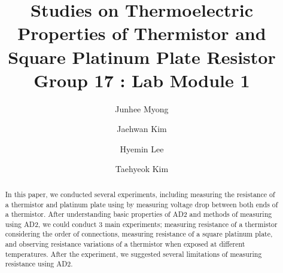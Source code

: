 \documentclass[5p,sort&compress]{elsarticle}
\begin{document}
\begin{frontmatter}
    \title{{\LARGE Studies on Thermoelectric Properties of Thermistor and Square Platinum Plate Resistor}
    \\  {\normalsize Group 17 : Lab Module 1}
    }

    \author[1]{Junhee Myong}
    \author[2]{Jaehwan Kim}
    \author[3]{Hyemin Lee}
    \author[4]{Taehyeok Kim}
    \address[1]{College of Liberal Studies, Seoul National University, Seoul 08858 Korea}
    \address[2]{Department of Physics \& Astronomy, Seoul National University, Seoul 08858 Korea}   
    \address[3]{Department of Physics \& Astronomy, Seoul National University, Seoul 08858 Korea}    
    \address[4]{School of Earth \& Environmental Sciences, Seoul National University, Seoul 08858 Korea}    
    \date{}
    \begin{abstract}
        In this paper, we conducted several experiments, including measuring the resistance of a thermistor and platinum plate using by measuring voltage drop between both ends of a thermistor. After understanding basic properties of AD2 and methods of measuring using AD2, we could conduct 3 main experiments; measuring resistance of a thermistor considering the order of connections, measuring resistance of a square platinum plate, and observing resistance variations of a thermistor when exposed at different temperatures. After the experiment, we suggested several limitations of measuring resistance using AD2.
    \end{abstract}


\end{frontmatter}

\end{document}
